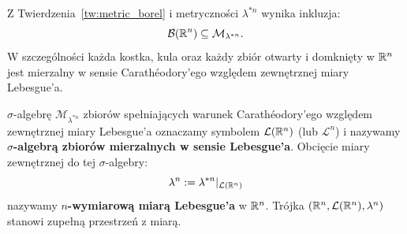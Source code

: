 \begin{wn} Z Twierdzenia~\ref{tw:metric_borel} i metryczności $\lambda^{*n}$ wynika inkluzja:
    \begin{equation*}
        \mathcal{B}({\mathbb{R}^{n}}) \subseteq \mathcal{M}_{\lambda^{*n}}.
    \end{equation*}
    W szczególności każda kostka, kula oraz każdy zbiór otwarty i domknięty w $\mathbb{R}^{n}$ jest mierzalny w sensie Carathéodory'ego względem zewnętrznej miary Lebesgue'a.
\end{wn}
\begin{defi}
    $\sigma$-algebrę $\mathcal{M}_{\lambda^{*n}}$ zbiorów spełniających warunek Carathéodory'ego względem zewnętrznej miary Lebesgue'a oznaczamy symbolem $\mathcal{L}(\mathbb{R}^{n})$ (lub $\mathcal{L}^n$) i nazywamy \textbf{$\sigma$-algebrą zbiorów mierzalnych w sensie Lebesgue'a}. Obcięcie miary zewnętrznej do tej $\sigma$-algebry:
    \begin{equation*}
        \lambda^n := \lambda^{*n}|_{\mathcal{L}({\mathbb{R}^{n}})}
    \end{equation*}
    nazywamy \textbf{$n$-wymiarową miarą Lebesgue'a} w $\mathbb{R}^{n}$. Trójka $(\mathbb{R}^{n}, \mathcal{L}({\mathbb{R}^{n}}), \lambda^n)$ stanowi zupełną przestrzeń z miarą.
\end{defi}
